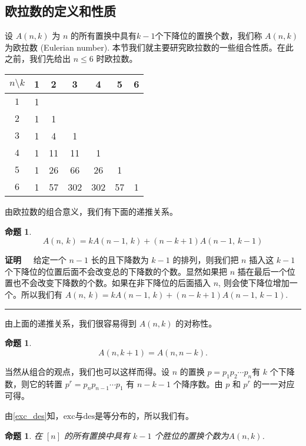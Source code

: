 \documentclass[a4paper,11pt,twoside]{book}
\newtheorem{prop}[thm]{命题}
\def\qed{\nopagebreak\hfill{\rule{4pt}{7pt}}\medbreak}
\def\pf{{\bf 证明~~ }}
\def \des{\mathrm{des}}
\def \exc{\mathrm{exc}}
\begin{document}
\subsection{欧拉数的定义和性质}
设 $A(n,k)$ 为 $n$ 的所有置换中具有$k-1$个下降位的置换个数，我们称
$A(n,k)$ 为欧拉数 (Eulerian number).
本节我们就主要研究欧拉数的一些组合性质。在此之前，我们先给出 $n\leq
6$ 时欧拉数。

\begin{tabular}{c|c|c|c|c|c|c}
 $n \setminus k$    &1 &2 &3  &4  &5  &6\\
\hline $1$       &1  \\
\hline $2$       &1 &1 \\
\hline $3$       &1 &4 &1  \\
\hline $4$       &1 &11 &11  &1 \\
\hline $5$       &1 &26 &66  &26  &1 \\
\hline $6$       &1 &57 &302 &302 &57 &1
\end{tabular}

由欧拉数的组合意义，我们有下面的递推关系。

\begin{prop}\label{p1}
\begin{equation}
A(n,\,k)=kA(n-1,\, k)+(n-k+1)A(n-1,\,k-1)
\end{equation}
\end{prop}

\pf 给定一个 $n-1$ 长的且下降数为 $k-1$ 的排列，则我们把 $n$ 插入这
$k-1$ 个下降位的位置后面不会改变总的下降数的个数。显然如果把 $n$
插在最后一个位置也不会改变下降数的个数。如果在非下降位的后面插入
$n$, 则会使下降位增加一个。所以我们有 $A(n,\,k)=kA(n-1,\,
k)+(n-k+1)A(n-1,\,k-1).$ \qed

由上面的递推关系，我们很容易得到 $A(n,k)$ 的对称性。
\begin{prop}
\begin{equation}
A(n,k+1)=A(n,n-k).
\end{equation}
\end{prop}

当然从组合的观点，我们也可以这样而得。设 $n$ 的置换 $p=p_{1}p_{2}
\cdots p_n$有 $k$ 个下降数，则它的转置 $p^r=p_{n}p_{n-1}\cdots p_1$
有 $n-k-1$ 个降序数。由 $p$ 和 $p^r$ 的一一对应可得。

由\ref{exc_des}知，$\exc$与$\des$是等分布的，所以我们有。
\begin{prop}
在 $[n]$ 的所有置换中具有 $k-1$ 个胜位的置换个数为$A(n,k)$.
\end{prop}
\end{document}
